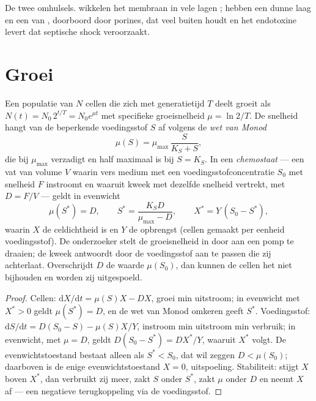 \begin{omfigure}
{\small De twee omhulsels.  wikkelen het membraan in vele
lagen ;  hebben een dunne laag en een
 van , doorboord door porines, dat veel
 buiten houdt en het endotoxine levert dat septische shock
veroorzaakt.}
\end{omfigure}

\section{Groei}

\begin{theorem}\label{thm:b3:bacteriology:monod}
Een populatie van $N$ cellen die zich met generatietijd $T$ deelt
groeit als $N(t) = N_{0}\,2^{t/T} = N_{0}e^{\mu t}$ met specifieke groeisnelheid $\mu =
\ln 2/T$. De snelheid hangt van de beperkende voedingsstof $S$ af
volgens de \emph{wet van Monod}
\[
\mu(S) = \mu_{\max}\,\frac{S}{K_{S} + S},
\]
die bij $\mu_{\max}$ verzadigt en half maximaal is bij $S = K_{S}$. In
een \emph{chemostaat} --- een vat van volume $V$ waarin vers medium met
een voedingsstofconcentratie $S_{0}$ met snelheid $F$ instroomt en
waaruit kweek met dezelfde snelheid vertrekt, met 
$D = F/V$ --- geldt in evenwicht
\[
\mu(S^{*}) = D,\qquad S^{*} = \frac{K_{S}D}{\mu_{\max} - D},\qquad
X^{*} = Y\,(S_{0} - S^{*}),
\]
waarin $X$ de celdichtheid is en $Y$ de opbrengst (cellen gemaakt per
eenheid voedingsstof). De onderzoeker stelt de groeisnelheid in door
aan een pomp te draaien; de kweek antwoordt door de voedingsstof aan te
passen die zij achterlaat. Overschrijdt $D$ de waarde $\mu(S_{0})$, dan
kunnen de cellen het niet bijhouden en worden zij uitgespoeld.
\end{theorem}
\begin{proof}
Cellen: $\mathrm{d}X/\mathrm{d}t = \mu(S)X - DX$, groei min uitstroom;
in evenwicht met $X^{*} > 0$ geldt $\mu(S^{*}) = D$, en de wet van
Monod omkeren geeft $S^{*}$. Voedingsstof:
$\mathrm{d}S/\mathrm{d}t = D(S_{0} -
S) - \mu(S)X/Y$, instroom min uitstroom min verbruik; in evenwicht, met
$\mu = D$, geldt $D(S_{0} - S^{*}) = DX^{*}/Y$, waaruit $X^{*}$ volgt.
De evenwichtstoestand bestaat alleen als $S^{*} < S_{0}$, dat wil
zeggen $D <
\mu(S_{0})$; daarboven is de enige evenwichtstoestand $X = 0$,
uitspoeling. Stabiliteit: stijgt $X$ boven $X^{*}$, dan verbruikt zij
meer, zakt $S$ onder $S^{*}$, zakt $\mu$ onder $D$ en neemt $X$ af ---
een negatieve terugkoppeling via de voedingsstof.
\end{proof}

